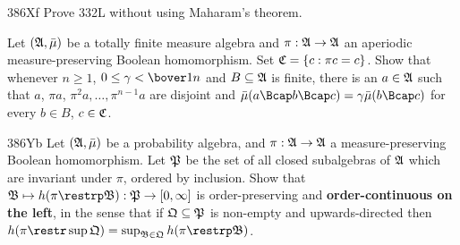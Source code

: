 {\spheader 386Xf Prove 332L without using Maharam's theorem.
     
Let $(\frak A,\bar\mu)$ be a totally finite measure algebra and
$\pi:\frak A\to\frak A$ an aperiodic
measure-preserving Boolean homomorphism.   Set $\frak C=\{c:\pi c=c\}$.
Show that whenever $n\ge 1$, $0\le\gamma<\bover1n$ and
$B\subseteq\frak A$ is finite, there is an $a\in\frak A$ such
that $a$, $\pi a$, $\pi^2a,\ldots,\pi^{n-1}a$ are disjoint and
$\bar\mu(a\Bcap b\Bcap c)=\gamma\bar\mu(b\Bcap c)$ for every $b\in B$,
$c\in\frak C$.
     
\spheader 386Yb %
Let $(\frak A,\bar\mu)$ be a probability algebra, and
$\pi:\frak A\to\frak A$ a measure-preserving Boolean homomorphism.   Let
$\frak P$ be the set of all closed subalgebras of $\frak A$ which are
invariant under $\pi$, ordered by inclusion.   Show that
$\frak B\mapsto h(\pi\restrp\frak{B}):\frak P\to[0,\infty]$ is
order-preserving and
{\bf order-continuous on the left}, in the sense that if 
$\frak Q\subseteq\frak P$ is non-empty and upwards-directed then
$h(\pi\restr\sup\frak Q)=\sup_{\frak B\in\frak Q}h(\pi\restrp\frak{B})$.
}%
     
     
\discrpage
     

